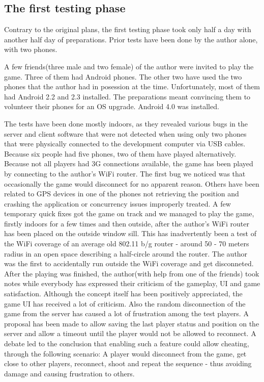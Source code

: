\documentclass{article}
\begin{document}
\subsection{The first testing phase}

Contrary to the original plans, the first testing phase took only half a day
with another half day of preparations. Prior tests have been done by the
author alone, with two phones.\newline

A few friends(three male and two female) of the author were invited to play the
game. Three of them had Android phones. The other two have used
the two phones that the author had in posession at the time. Unfortunately, most
of them had Android 2.2 and 2.3 installed. The preparations meant convincing
them to volunteer their phones for an OS upgrade. Android 4.0 was
installed.\newline

The tests have been done mostly indoors, as they revealed various bugs in the
server and client software that were not detected when using only two phones
that were physically connected to the development computer via USB
cables. Because six people had five phones, two of them have played
alternatively. Because not all players had 3G connections available, the game
has been played by connecting to the author's WiFi router. The first bug we
noticed was that occasionally the game would disconnect for no apparent reason.
Others have been related to GPS devices in one of the phones not retrieving the
position and crashing the application or concurrency issues improperly treated.
A few temporary quick fixes got the game on track and we managed to play the
game, firstly indoors for a few times and then outside, after the author's WiFi
router has been placed on the outside window sill. This has inadvertently been a
test of the WiFi coverage of an average old 802.11 b/g router - around 50 - 70
meters radius in an open space describing a half-circle around the router. The
author was the first to accidentally run outside the WiFi coverage and get
disconneted. After the playing was finished, the author(with help from one of
the friends) took notes while everybody has expressed their criticism of the
gameplay, UI and game satisfaction. Although the concept itself has been
positively appreciated, the game UI has received a lot of criticism. Also the
random disconnection of the game from the server has caused a lot of frustration
among the test players. A proposal has been made to allow saving the last
player status and position on the server and allow a timeout until the player
would not be allowed to reconnect. A debate led to the conclusion that
enabling such a feature could allow cheating, through the following scenario: A
player would disconnect from the game, get close to other players, reconnect,
shoot and repeat the sequence - thus avoiding damage and causing frustration to
others. \newline
\end{document}
